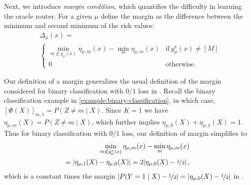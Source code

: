 



Next, we introduce \emph{margin condition}, which quantifies the difficulty in learning the oracle router.  For a given $\mu$ define the margin as the difference between the minimum and second minimum of the risk values: 
{ \begin{equation}\label{eq:margin}
    \begin{aligned}
        & \textstyle \Delta_\mu(x) =  \\
  &  \begin{cases}
       \min\limits_{m \notin g_\mu(x)} \eta_{\mu, m}(x) - \min\limits_m \eta_{\mu, m}(x) & \text{if} ~ g_\mu^\star(x) \neq [M]\\ 
       0 & \text{otherwise}.
       \end{cases} 
    \end{aligned}
\end{equation}}

\noindent Our definition of a margin generalizes the usual definition of the margin considered for binary classification with $0/1$ loss in \citet{audibert2007Fast}. Recall the binary classification example in \ref{example:binary-classification}, in which case, 
$[\Phi(X)]_{m , 1} =  P(Z \neq m\mid X) $. Since $K = 1$ we have 
$\eta_{\mu, m}(X) = P(Z \neq m\mid X) $, which further implies $\eta_{\mu, 0}(X) + \eta_{\mu, 1}(X) = 1$.
Thus for binary classification with $0/1$ loss, our definition of margin simplifies to 
\begin{align*}
\textstyle \min\limits_{m \notin g_\mu^\star(x)} \eta_{\mu, m}(x) - \min\limits_m \eta_{\mu, m}(x)\\
=  |\eta_{\mu, 1}(X) - \eta_{\mu, 0}(X)| = 2 |\eta_{\mu, 0}(X) - \nicefrac{1}{2}| \,,
\end{align*}
which is a constant times the margin $  |P(Y = 1\mid X) - \nicefrac{1}{2}| = |\eta_{\mu, 0}(X) - \nicefrac{1}{2}| $ in \citet{audibert2007Fast}. 


